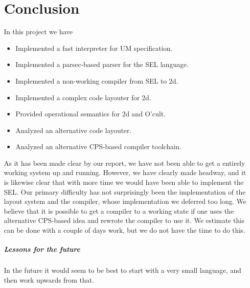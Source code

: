 \chapter*{Conclusion}

In this project we have
\begin{itemize}
\item Implemented a fast interpreter for UM specification.
\item Implemented a parsec-based parser for the SEL language.
\item Implemented a non-working compiler from SEL to 2d.
\item Implemented a complex code layouter for 2d.
\item Provided operational semantics for 2d and O'cult.
\item Analyzed an alternative code layouter.
\item Analyzed an alternative CPS-based compiler toolchain.
\end{itemize}

As it has been made clear by our report, we have not been able to get
a entirely working system up and running. However, we have clearly
made headway, and it is likewise clear that with more time we would
have been able to implement the SEL. Our primary difficulty has not
surprisingly been the implementation of the layout system and the
compiler, whose implementation we deferred too long. We believe that
it is possible to get a compiler to a working state if one uses the
alternative CPS-based idea and rewrote the compiler to use it. We
estimate this can be done with a couple of days work, but we do not
have the time to do this.

\paragraph{Lessons for the future}
In the future it would seem to be best to start with a very small
language, and then work upwards from that.

